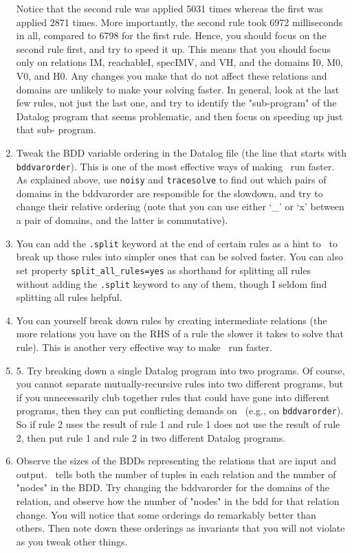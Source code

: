 \begin{enumerate}
Notice that the second rule was applied 5031 times whereas the first
was applied 2871 times.  More importantly, the second rule took 6972
milliseconds in all, compared to 6798 for the first rule.  Hence, you
should focus on the second rule first, and try to speed it up.  This
means that you should focus only on relations IM, reachableI, specIMV,
and VH, and the domains I0, M0, V0, and H0.  Any changes you make that
do not affect these relations and domains are unlikely to make your
solving faster.  In general, look at the last few rules, not just the
last one, and try to identify the "sub-program" of the Datalog program
that seems problematic, and then focus on speeding up just that sub-
program.
\item
Tweak the BDD variable ordering in the Datalog file (the line that
starts with \verb+bddvarorder+).  This is one of the most
effective ways of making \bddbddb\ run faster.  As explained above, use
\verb+noisy+ and \verb+tracesolve+ to find out which pairs of domains in the
bddvarorder are responsible for the slowdown, and try to change their
relative ordering (note that you can use either `\_' or `x' between a pair
of domains, and the latter is commutative).
\item
You can add the \verb+.split+ keyword at the end of certain rules as a
hint to \bddbddb\ to break up those rules into simpler ones that can be
solved faster.  You can also set property \verb+split_all_rules=yes+ as shorthand
for splitting all rules without adding the \verb+.split+ keyword to any of
them, though I seldom find splitting all rules helpful.

\item
You can yourself break down rules by creating intermediate relations (the more
relations you have on the RHS of a rule the slower it takes to solve
that rule).  This is another very effective way to make \bddbddb\ run
faster.

\item
5. Try breaking down a single Datalog program into two programs.  Of
course, you cannot separate mutually-recursive rules into two
different programs, but if you unnecessarily club
together rules that could have gone into different programs, then they
can put conflicting demands on \bddbddb\ (e.g., on \verb+bddvarorder+).
So if rule 2 uses the result of rule 1 and rule 1 does not use the result of
rule 2, then put rule 1 and rule 2 in two different Datalog programs.

\item
Observe the sizes of the BDDs representing the relations that are
input and output.  \bddbddb\ tells both the number of tuples in each
relation and the number of "nodes" in the BDD.  Try changing the
bddvarorder for the domains of the relation, and observe how the
number of "nodes" in the bdd for that relation change.  You will
notice that some orderings do remarkably better than others.  Then
note down these orderings as invariants that you will not violate as
you tweak other things.


\end{enumerate}
